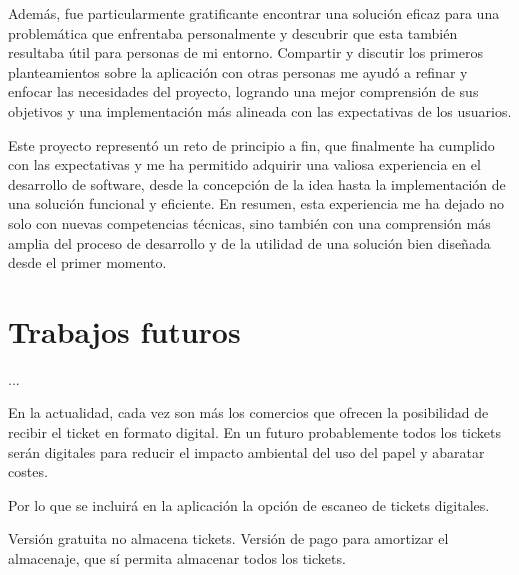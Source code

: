 Además, fue particularmente gratificante encontrar una solución eficaz para una problemática que enfrentaba personalmente y descubrir que esta también resultaba útil para personas de mi entorno. Compartir y discutir los primeros planteamientos sobre la aplicación con otras personas me ayudó a refinar y enfocar las necesidades del proyecto, logrando una mejor comprensión de sus objetivos y una implementación más alineada con las expectativas de los usuarios.

Este proyecto representó un reto de principio a fin, que finalmente ha cumplido con las expectativas y me ha permitido adquirir una valiosa experiencia en el desarrollo de software, desde la concepción de la idea hasta la implementación de una solución funcional y eficiente. En resumen, esta experiencia me ha dejado no solo con nuevas competencias técnicas, sino también con una comprensión más amplia del proceso de desarrollo y de la utilidad de una solución bien diseñada desde el primer momento.


\section{Trabajos futuros}
...

En la actualidad, cada vez son más los comercios que ofrecen la posibilidad de recibir 
el ticket en formato digital. En un futuro probablemente todos los tickets serán 
digitales para reducir el impacto ambiental del uso del papel y abaratar costes.

Por lo que se incluirá en la aplicación la opción de escaneo de tickets digitales.


Versión gratuita no almacena tickets.
Versión de pago para amortizar el almacenaje, que sí permita almacenar todos los tickets.